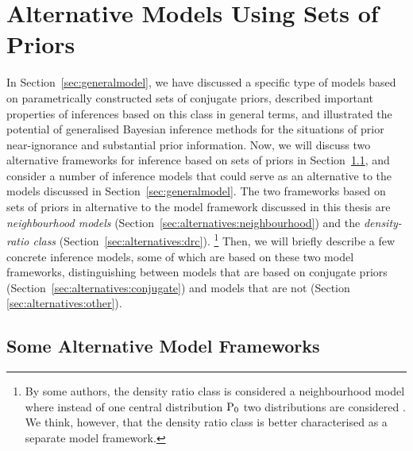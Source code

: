 \section{Alternative Models Using Sets of Priors}
\label{sec:alternatives}


In Section~\ref{sec:generalmodel},
we have discussed a specific type of models based on parametrically constructed sets of conjugate priors,
described important properties of inferences based on this class in general terms,
and illustrated the potential of generalised Bayesian inference methods
for the situations of prior near-ignorance and substantial prior information.
Now, we will discuss two alternative frameworks for inference based on sets of priors in Section~\ref{sec:alternatives:frameworks},
and consider a number of inference models that could serve as an alternative to the models discussed in Section~\ref{sec:generalmodel}.
The two frameworks based on sets of priors
in alternative to the model framework discussed in this thesis are 
\emph{neighbourhood models} (Section~\ref{sec:alternatives:neighbourhood}) and
the \emph{density-ratio class} (Section~\ref{sec:alternatives:drc}).%
\footnote{By some authors, the density ratio class is considered a neighbourhood model
where instead of one central distribution $\operatorname{P}_0$ two distributions are considered
\parencite[e.g.,][\S 4.3]{1991:pericchi}.
We think, however, that the density ratio class is better characterised as a separate model framework.}
Then, we will briefly describe a few concrete inference models,
some of which are based on these two model frameworks,
distinguishing between models that are based on conjugate priors (Section~\ref{sec:alternatives:conjugate})
and models that are not (Section \ref{sec:alternatives:other}).


\subsection{Some Alternative Model Frameworks}
\label{sec:alternatives:frameworks}

